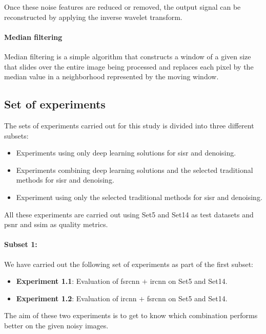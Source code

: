 Once these noise features are reduced or removed, the output signal can be reconstructed by applying the inverse wavelet transform.

\paragraph{Median filtering}
Median filtering is a simple algorithm that constructs a window of a given size that slides over the entire image being processed and replaces each pixel by the median value in a neighborhood represented by the moving window.

\subsection{Set of experiments}
The sets of experiments carried out for this study is divided into three different subsets:
\begin{itemize}
	\item Experiments using only deep learning solutions for \gls{sisr} and denoising.
	\item Experiments combining deep learning solutions and the selected traditional methods for \gls{sisr} and denoising.
	\item Experiment using only the selected traditional methods for \gls{sisr} and denoising.
\end{itemize}
All these experiments are carried out using Set5 \cite{SET5} and Set14 \cite{SET14} as test datasets and \gls{psnr} and \gls{ssim} as quality metrics.

\paragraph{Subset 1:}
We have carried out the following set of experiments as part of the first subset:
\begin{itemize}
	\item \textbf{Experiment 1.1}: Evaluation of \gls{fsrcnn} $+$ \gls{ircnn} on Set5 and Set14.
	\item \textbf{Experiment 1.2}: Evaluation of \gls{ircnn} $+$ \gls{fsrcnn} on Set5 and Set14.
\end{itemize}

The aim of these two experiments is to get to know which combination performs better on the given noisy images.

